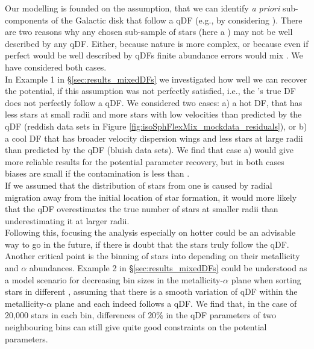 
  Our modelling is founded on the assumption, that we can identify {\sl a priori} sub-components of the Galactic disk that follow a qDF (e.g., by considering \MAPs{}). There are two reasons why any chosen sub-sample of stars (here a \MAP{}) may not be well described by any qDF. Either, because nature is more complex, or because even if perfect
\MAPs{} would be well described by qDFs finite abundance errors would mix \MAPs{}.  We have considered both cases. 
\\In Example 1 in \S\ref{sec:results_mixedDFs} we investigated how well we can recover the potential, if this assumption was not perfectly satisfied, i.e., the \MAP{}'s true DF does not perfectly follow a qDF. We considered two cases: a) a hot DF, that has less stars at small radii and more stars with low velocities than predicted by the qDF (reddish data sets in Figure \ref{fig:isoSphFlexMix_mockdata_residuals}), or b) a cool DF that has broader velocity dispersion wings and less stars at large radii than predicted by the qDF (bluish data sets). We find that case a) would give more reliable results for the potential parameter recovery, but in both cases biases are small if the contamination is less than \Wilma{[TO DO: CHECK]}.
\\If we assumed that the distribution of stars from one \MAP{} is caused by radial migration away from the initial location of star formation, it would more likely that the qDF overestimates the true number of stars at smaller radii than underestimating it at larger radii. 
\\Following this, focusing the analysis especially on hotter \MAPs{} could be an advisable way to go in the future, if there is doubt that the stars truly follow the qDF.
\\Another critical point is the binning of stars into \MAPs{} depending on their metallicity and $\alpha$ abundances. Example 2 in \S\ref{sec:results_mixedDFs} could be understood as a model scenario for decreasing bin sizes in the metallicity-$\alpha$ plane when sorting stars in different \MAPs{}, assuming that there is a smooth variation of qDF within the metallicity-$\alpha$ plane and each \MAP{} indeed follows a qDF. We find that, in the case of 20,000 stars in each bin, differences of $20\%$ in the qDF parameters of two neighbouring bins can still give quite good constraints on the potential parameters. 

